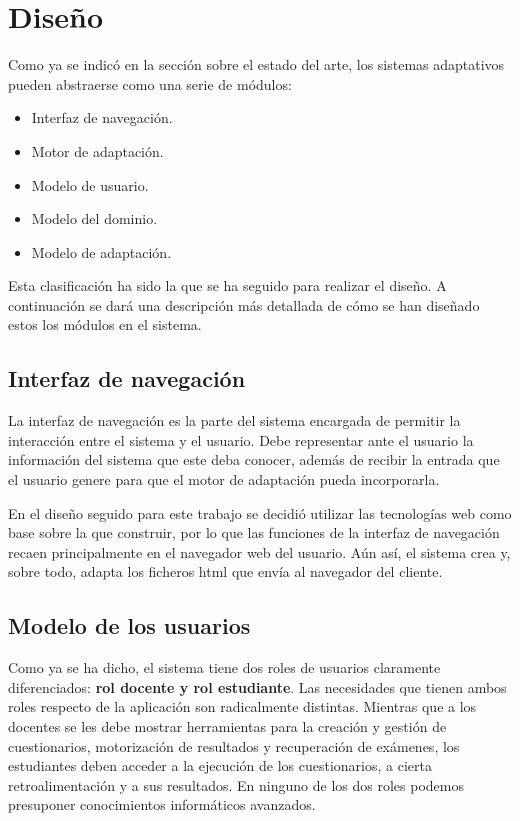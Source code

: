 
\section{Diseño}

Como ya se indicó en la sección sobre el estado del arte, los sistemas adaptativos pueden abstraerse como una serie de módulos:

\begin{itemize}
	\item Interfaz de navegación.
	\item Motor de adaptación.
	\item Modelo de usuario.
	\item Modelo del dominio.
	\item Modelo de adaptación.
\end{itemize} 

Esta clasificación ha sido la que se ha seguido para realizar el diseño. A continuación se dará una descripción más detallada de cómo se han diseñado estos los módulos en el sistema.

\subsection{Interfaz de navegación}

La interfaz de navegación es la parte del sistema encargada de permitir la interacción entre el sistema y el usuario. Debe representar ante el usuario la información del sistema que este deba conocer, además de recibir la entrada que el usuario genere para que el motor de adaptación pueda incorporarla.

En el diseño seguido para este trabajo se decidió utilizar las tecnologías web como base sobre la que construir, por lo que las funciones de la interfaz de navegación recaen principalmente en el navegador web del usuario. Aún así, el sistema crea y, sobre todo, adapta los ficheros html que envía al navegador del cliente.

\subsection{Modelo de los usuarios}


Como ya se ha dicho, el sistema tiene dos roles de usuarios claramente diferenciados: \textbf{rol docente y rol estudiante}. Las necesidades que tienen ambos roles respecto de la aplicación son radicalmente distintas. Mientras que a los docentes se les debe mostrar herramientas para la creación y gestión de cuestionarios, motorización de resultados y recuperación de exámenes, los estudiantes deben acceder a la ejecución de los cuestionarios, a cierta retroalimentación y a sus resultados. En ninguno de los dos roles podemos presuponer conocimientos informáticos avanzados.%

